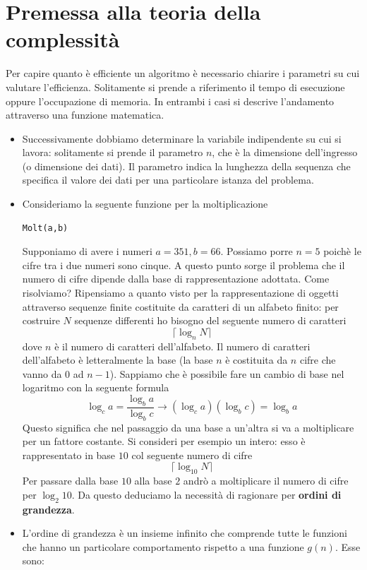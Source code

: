 \section{Premessa alla teoria della complessità}
Per capire quanto è efficiente un algoritmo è necessario chiarire i parametri su cui valutare l'efficienza. Solitamente si prende a riferimento il tempo di esecuzione oppure l'occupazione di memoria. In entrambi i casi si descrive l'andamento attraverso una funzione matematica.
\begin{itemize}
	\item Successivamente dobbiamo determinare la variabile indipendente su cui si lavora: solitamente si prende il parametro $n$, che è la dimensione dell'ingresso (o dimensione dei dati). Il parametro indica la lunghezza della sequenza che specifica il valore dei dati per una particolare istanza del problema.
	\item Consideriamo la seguente funzione per la moltiplicazione
	\begin{verbatim}Molt(a,b)\end{verbatim}
	Supponiamo di avere i numeri $a=351, b=66$. Possiamo porre $n=5$ poichè le cifre tra i due numeri sono cinque. A questo punto sorge il problema che il numero di cifre dipende dalla base di rappresentazione adottata. Come risolviamo? Ripensiamo a quanto visto per la rappresentazione di oggetti attraverso sequenze finite costituite da caratteri di un alfabeto finito: per costruire $N$ sequenze differenti ho bisogno del seguente numero di caratteri
	\[\lceil \log_n N \rceil\]
	dove $n$ è il numero di caratteri dell'alfabeto. Il numero di caratteri dell'alfabeto è letteralmente la base (la base $n$ è costituita da $n$ cifre che vanno da $0$ ad $n-1$). Sappiamo che è possibile fare un cambio di base nel logaritmo con la seguente formula
	\[\log_c a = \frac{\log_b a}{\log_b c} \longrightarrow \left(\log_c a\right) \left(\log_b c\right) = \log_b a\]
	Questo significa che nel passaggio da una base a un'altra si va a moltiplicare per un fattore costante. Si consideri per esempio un intero: esso è rappresentato in base $10$ col seguente numero di cifre
	\[\lceil \log_{10}N \rceil\]
	Per passare dalla base $10$ alla base $2$ andrò a moltiplicare il numero di cifre per $\log_2 10$. Da questo deduciamo la necessità di ragionare per \textbf{ordini di grandezza}.
	\item L'ordine di grandezza è un insieme infinito che comprende tutte le funzioni che hanno un particolare comportamento rispetto a una funzione $g(n)$. Esse sono:
	\begin{itemize}

\end{itemize}
\end{itemize}
